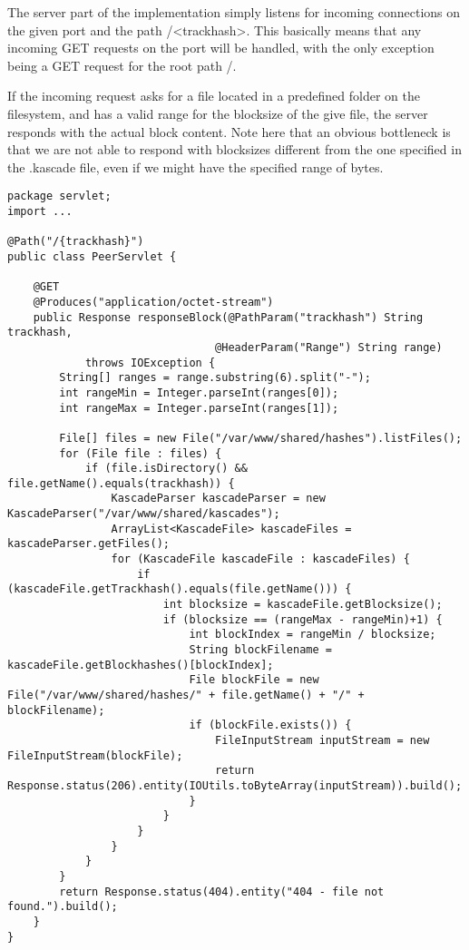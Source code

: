 \documentclass{acm_proc_article-sp}
\begin{document}
\onecolumn

The server part of the implementation simply listens for incoming connections on the given port and the path /<trackhash>. This basically means that any incoming GET requests on the port will be handled, with the only exception being a GET request for the root path /.

If the incoming request asks for a file located in a predefined folder on the filesystem, and has a valid range for the blocksize of the give file, the server responds with the actual block content. Note here that an obvious bottleneck is that we are not able to respond with blocksizes different from the one specified in the .kascade file, even if we might have the specified range of bytes.


\begin{lstlisting}[caption=The PeerServlet class responsible for handling incoming requests]
package servlet;
import ...

@Path("/{trackhash}")
public class PeerServlet {

    @GET
    @Produces("application/octet-stream")
    public Response responseBlock(@PathParam("trackhash") String trackhash,
                                @HeaderParam("Range") String range)
            throws IOException {
        String[] ranges = range.substring(6).split("-");
        int rangeMin = Integer.parseInt(ranges[0]);
        int rangeMax = Integer.parseInt(ranges[1]);

        File[] files = new File("/var/www/shared/hashes").listFiles();
        for (File file : files) {
            if (file.isDirectory() && file.getName().equals(trackhash)) {
                KascadeParser kascadeParser = new KascadeParser("/var/www/shared/kascades");
                ArrayList<KascadeFile> kascadeFiles = kascadeParser.getFiles();
                for (KascadeFile kascadeFile : kascadeFiles) {
                    if (kascadeFile.getTrackhash().equals(file.getName())) {
                        int blocksize = kascadeFile.getBlocksize();
                        if (blocksize == (rangeMax - rangeMin)+1) {
                            int blockIndex = rangeMin / blocksize;
                            String blockFilename = kascadeFile.getBlockhashes()[blockIndex];
                            File blockFile = new File("/var/www/shared/hashes/" + file.getName() + "/" + blockFilename);
                            if (blockFile.exists()) {
                                FileInputStream inputStream = new FileInputStream(blockFile);
                                return Response.status(206).entity(IOUtils.toByteArray(inputStream)).build();
                            }
                        }
                    }
                }
            }
        }
        return Response.status(404).entity("404 - file not found.").build();
    }
}
\end{lstlisting}
\end{document}
